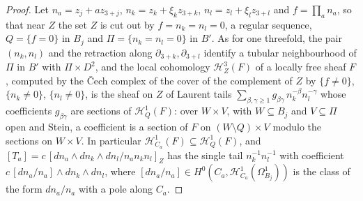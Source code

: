 \begin{proof}
Let $n_{a}=z_{j}+az_{3+j}$, $n_{k}=z_{k}+\xi_{k}z_{3+k}$, $n_{l}=z_{l}+\xi_{l}z_{3+l}$ and $f=\prod_{a}n_{a}$, so that near $Z$ the set $Z$ is cut out by $f=n_{k}=n_{l}=0$, a regular sequence, $Q=\{f=0\}$ in $B_{j}$ and $\Pi=\{n_{k}=n_{l}=0\}$ in $B'$. As for one threefold, the pair $(n_{k},n_{l})$ and the retraction along $\partial_{3+k},\partial_{3+l}$ identify a tubular neighbourhood of $\Pi$ in $B'$ with $\Pi\times D^{2}$, and the local cohomology $\mathcal{H}^{3}_{Z}(F)$ of a locally free sheaf $F$, computed by the \v{C}ech complex of the cover of the complement of $Z$ by $\{f\ne0\}$, $\{n_{k}\ne0\}$, $\{n_{l}\ne0\}$, is the sheaf on $Z$ of Laurent tails $\sum_{\beta,\gamma\ge1}g_{\beta\gamma}\,n_{k}^{-\beta}n_{l}^{-\gamma}$ whose coefficients $g_{\beta\gamma}$ are sections of $\mathcal{H}^{1}_{Q}(F)$: over $W\times V$, with $W\subseteq B_{j}$ and $V\subseteq\Pi$ open and Stein, a coefficient is a section of $F$ on $(W\setminus Q)\times V$ modulo the sections on $W\times V$. In particular $\mathcal{H}^{1}_{C_{a}}(F)\subseteq\mathcal{H}^{1}_{Q}(F)$, and $[T_{a}]=c\,[dn_{a}\wedge dn_{k}\wedge dn_{l}/n_{a}n_{k}n_{l}]_{Z}$ has the single tail $n_{k}^{-1}n_{l}^{-1}$ with coefficient $c\,[dn_{a}/n_{a}]\wedge dn_{k}\wedge dn_{l}$, where $[dn_{a}/n_{a}]\in H^{0}(C_{a},\mathcal{H}^{1}_{C_{a}}(\Omega^{1}_{B_{j}}))$ is the class of the form $dn_{a}/n_{a}$ with a pole along $C_{a}$.


\end{proof}
